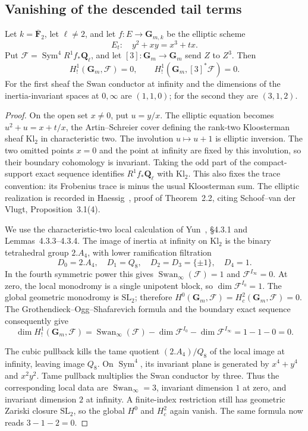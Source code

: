\subsection{Vanishing of the descended tail terms}

\begin{lemma}
\label{p2:lem:p2-kl-tails}
Let $k=\overline{\mathbf F}_2$, let $\ell\ne2$, and let
 $f:E\to\mathbf G_{m,k}$ be the elliptic scheme
\[
 E_t:\quad y^2+xy=x^3+tx.
\]
Put $\mathcal F=\operatorname{Sym}^4R^1f_*\mathbf Q_\ell$, and
 let $[3]:\mathbf G_m\to\mathbf G_m$ send $Z$ to $Z^3$.
Then
\[
 H^1_!(\mathbf G_m,\mathcal F)=0,
 \qquad H^1_!(\mathbf G_m,[3]^*\mathcal F)=0.
\]
For the first sheaf the Swan conductor at infinity and the
 dimensions of the inertia-invariant spaces at $0,\infty$ are
 $(1,1,0)$; for the second they are $(3,1,2)$.
\end{lemma}

\begin{proof}
On the open set $x\ne0$, put $u=y/x$.  The elliptic equation becomes
 $u^2+u=x+t/x$, the Artin--Schreier cover defining the rank-two
 Kloosterman sheaf $\mathrm{Kl}_2$ in characteristic two.
The involution $u\mapsto u+1$ is elliptic inversion.  The two
 omitted points $x=0$ and the point at infinity are fixed by this
 involution, so their boundary cohomology is invariant.  Taking
 the odd part of the compact-support exact sequence identifies
 $R^1f_*\mathbf Q_\ell$ with $\mathrm{Kl}_2$.  This also fixes
 the trace convention: its Frobenius trace is minus the usual
 Kloosterman sum.  The elliptic realization is recorded in
 Haessig~\cite{Haessig}, proof of Theorem~2.2, citing Schoof--van der Vlugt,
 Proposition~3.1(4).

We use the characteristic-two local calculation of Yun~\cite{Yun},
 \S4.3.1 and Lemmas~4.3.3--4.3.4.  The image of inertia at
 infinity on $\mathrm{Kl}_2$ is the binary tetrahedral group
 $2.A_4$, with lower ramification filtration
\[
 D_0=2.A_4,\quad D_1=Q_8,\quad D_2=D_3=\{\pm1\},
 \quad D_4=1.
\]
In the fourth symmetric power this gives
 $\operatorname{Swan}_\infty(\mathcal F)=1$ and
 $\mathcal F^{I_\infty}=0$.  At zero, the local monodromy is a
 single unipotent block, so $\dim\mathcal F^{I_0}=1$.
The global geometric monodromy is $\mathrm{SL}_2$; therefore
 $H^0(\mathbf G_m,\mathcal F)=H^2_c(\mathbf G_m,\mathcal F)=0$.
The Grothendieck--Ogg--Shafarevich formula and the boundary
 exact sequence consequently give
\[
 \dim H^1_!(\mathbf G_m,\mathcal F)
 =\operatorname{Swan}_\infty(\mathcal F)
  -\dim\mathcal F^{I_0}-\dim\mathcal F^{I_\infty}=1-1-0=0.
\]

The cubic pullback kills the tame quotient $(2.A_4)/Q_8$ of
 the local image at infinity, leaving image $Q_8$.
On $\operatorname{Sym}^4$, its invariant plane is generated by
 $x^4+y^4$ and $x^2y^2$.  Tame pullback multiplies the Swan
 conductor by three.  Thus the corresponding local data are
 $\operatorname{Swan}_\infty=3$, invariant dimension $1$ at zero,
 and invariant dimension $2$ at infinity.  A finite-index
 restriction still has geometric Zariski closure $\mathrm{SL}_2$,
 so the global $H^0$ and $H^2_c$ again vanish.  The same formula
 now reads $3-1-2=0$.
\end{proof}

